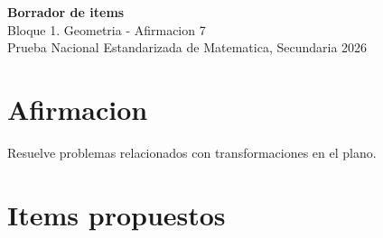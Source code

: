 \documentclass[12pt]{article}
\begin{document}
\begin{center}
  {\Large \textbf{Borrador de items}}\\
  {\large Bloque 1. Geometria - Afirmacion 7}\\[4pt]
  Prueba Nacional Estandarizada de Matematica, Secundaria 2026
\end{center}

\section*{Afirmacion}
Resuelve problemas relacionados con transformaciones en el plano.

\section*{Items propuestos}
\end{document}
